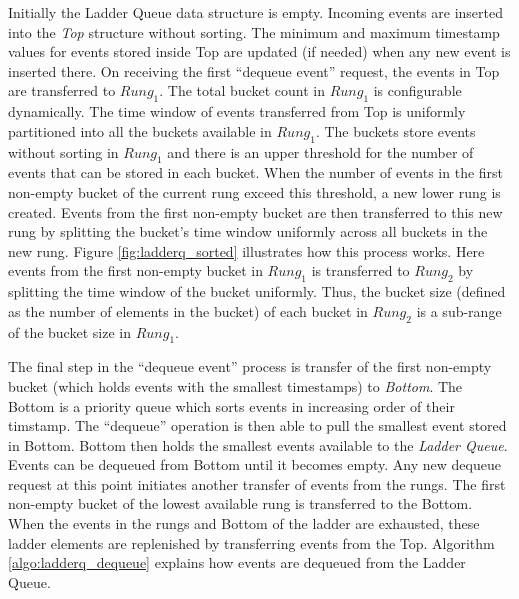 \documentclass[11pt]{book}
\begin{document}
Initially the Ladder Queue data structure is empty.  Incoming events are inserted into the \emph{Top}
structure without sorting.  The minimum and maximum timestamp values for events stored inside Top are updated
(if needed) when any new event is inserted there.  On receiving the first ``dequeue event'' request, the
events in Top are transferred to $Rung_1$.  The total bucket count in $Rung_1$ is configurable dynamically.
The time window of events transferred from Top is uniformly partitioned into all the buckets available in
$Rung_1$.  The buckets store events without sorting in $Rung_1$ and there is an upper threshold for the number
of events that can be stored in each bucket.  When the number of events in the first non-empty bucket of the
current rung exceed this threshold, a new lower rung is created.  Events from the first non-empty bucket are
then transferred to this new rung by splitting the bucket's time window uniformly across all buckets in the
new rung.  Figure \ref{fig:ladderq_sorted} illustrates how this process works.  Here events from the first
non-empty bucket in $Rung_1$ is transferred to $Rung_2$ by splitting the time window of the bucket uniformly.
Thus, the bucket size (defined as the number of elements in the bucket) of each bucket in $Rung_2$ is a
sub-range of the bucket size in $Rung_1$.

The final step in the ``dequeue event'' process is transfer of the first non-empty bucket (which holds events
with the smallest timestamps) to \emph{Bottom}.  The Bottom is a priority queue which sorts events in
increasing order of their timstamp.  The ``dequeue'' operation is then able to pull the smallest event stored
in Bottom.  Bottom then holds the smallest events available to the \emph{Ladder Queue}.  Events can be
dequeued from Bottom until it becomes empty.  Any new dequeue request at this point initiates another transfer
of events from the rungs.  The first non-empty bucket of the lowest available rung is transferred to the
Bottom.  When the events in the rungs and Bottom of the ladder are exhausted, these ladder elements are
replenished by transferring events from the Top.  Algorithm \ref{algo:ladderq_dequeue} explains how events are
dequeued from the Ladder Queue.
\end{document}
